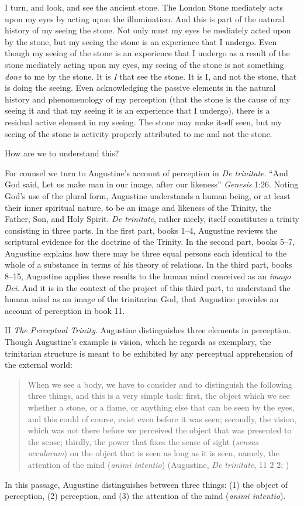 \documentclass[12pt]{article}
\begin{document}
I turn, and look, and see the ancient stone. The London Stone mediately acts upon my eyes by acting upon the illumination. And this is part of the natural history of my seeing the stone. Not only must my eyes be mediately acted upon by the stone, but my seeing the stone is an experience that I undergo. Even though my seeing of the stone is an experience that I undergo as a result of the stone mediately acting upon my eyes, my seeing of the stone is not something \emph{done} to me by the stone. It is \emph{I} that see the stone. It is I, and not the stone, that is doing the seeing. Even acknowledging the passive elements in the natural history and phenomenology of my perception (that the stone is the cause of my seeing it and that my seeing it is an experience that I undergo), there is a residual active element in my seeing. The stone may make itself seen, but my seeing of the stone is activity properly attributed to me and not the stone.

How are we to understand this?

For counsel we turn to Augustine's account of perception in \emph{De trinitate}. ``And God said, Let us make man in our image, after our likeness'' \emph{Genesis} 1:26. Noting God's use of the plural form, Augustine understands a human being, or at least their inner spiritual nature, to be an image and likeness of the Trinity, the Father, Son, and Holy Spirit. \emph{De trinitate}, rather nicely, itself constitutes a trinity consisting in three parts. In the first part, books 1--4, Augustine reviews the scriptural evidence for the doctrine of the Trinity. In the second part, books 5--7, Augustine explains how there may be three equal persons each identical to the whole of a substance in terms of his theory of relations. In the third part, books 8--15, Augustine applies these results to the human mind conceived as an \emph{imago Dei}. And it is in the context of the project of this third part, to understand the human mind as an image of the trinitarian God, that Augustine provides an account of perception in book 11.

II \emph{The Perceptual Trinity}. Augustine distinguishes three elements in perception. Though Augustine's example is vision, which he regards as exemplary, the trinitarian structure is meant to be exhibited by any perceptual apprehension of the external world:
\begin{quote}
	When we see a body, we have to consider and to distinguish the following three things, and this is a very simple task: first, the object which we see whether a stone, or a flame, or anything else that can be seen by the eyes, and this could of course, exist even before it was seen; secondly, the vision, which was not there before we perceived the object that was presented to the sense; thirdly, the power that fixes the sense of sight (\emph{sensus occulorum}) on the object that is seen as long as it is seen, namely, the attention of the mind (\emph{animi intentio}) (Augustine, \emph{De trinitate}, 11 2 2; \citealt[61--62]{Matthews:2002ly})
\end{quote}
In this passage, Augustine distinguishes between three things: (1) the object of perception, (2) perception, and (3) the attention of the mind (\emph{animi intentio}).
\end{document}
